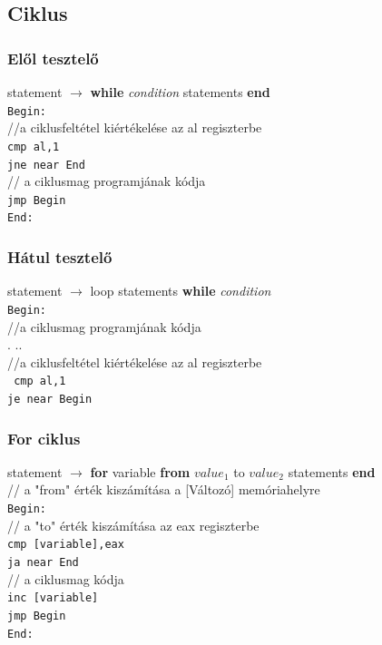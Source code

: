 \documentclass[12pt,margin=0px]{article}
\begin{document}
    \subsection*{Ciklus}

    \subsubsection*{Elől tesztelő}	

	statement $ \rightarrow $ \textbf{while} \emph{condition} statements \textbf{end}\\
	
	\noindent \texttt{Begin:}\\
    //a ciklusfeltétel kiértékelése az al regiszterbe\\
	\texttt{cmp al,1\\
	jne near End}\\
	// a ciklusmag programjának kódja\\
	\texttt{jmp Begin\\
	End:}
	
    \subsubsection*{Hátul tesztelő}	
	statement $ \rightarrow $ loop statements \textbf{while} \emph{condition}\\

	\noindent
    \texttt{Begin: }\\
    //a ciklusmag programjának kódja\\
    . ..\\
	//a ciklusfeltétel kiértékelése az al regiszterbe\\
    \texttt{
    cmp al,1\\
	je near Begin
    }
	
\subsubsection*{For ciklus}	

	statement $ \rightarrow $ \textbf{for} variable \textbf{from} $ value_1 $ to $ value_2 $ statements \textbf{end}\\
	
	\noindent // a "from" érték kiszámítása a [Változó] memóriahelyre\\
	\texttt{Begin: }\\
    // a "to" érték kiszámítása az eax regiszterbe\\
	\texttt{cmp [variable],eax\\
	ja near End}\\
	// a ciklusmag kódja\\
	\texttt{inc [variable]\\
	jmp Begin\\
	End:}
\end{document}

